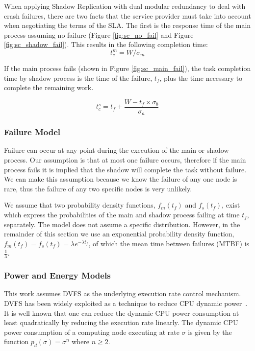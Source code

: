 When applying Shadow Replication with dual modular redundancy to deal with crash failures, 
there are two facts that the service provider must take into account
when negotiating the terms of the SLA. The first is the response time
of the main process assuming no failure (Figure
\ref{fig:sc_no_fail} and Figure \ref{fig:sc_shadow_fail}). This
results in the following completion time:
\begin{equation}
t_c^m=W/\sigma_m
\label{eq:tcm}
\end{equation}

If the main process fails (shown in Figure \ref{fig:sc_main_fail}), the
task completion time by shadow process is the time of the failure,
$t_f$, plus the time necessary to complete the remaining work.

\begin{equation}
t_c^s=t_f+\frac{W-t_f \times \sigma_b}{\sigma_a}
\label{eq:tcs}
\end{equation}

\subsubsection{Failure Model}
Failure can occur at any point during the execution of the main or
shadow process. Our assumption is that at most one failure occurs,
therefore if the main process fails it is implied that the shadow will
complete the task without failure. We can make this assumption because
we know the failure of any one node is rare, thus the failure
of any two specific nodes is very unlikely.

We assume that two probability density functions, $f_m(t_f)$ and
$f_s(t_f)$, exist which express the probabilities of the main and shadow
process failing at time $t_f$, separately. The model does not assume a
specific distribution. However, in the remainder of this section we use
an exponential probability density function, $f_m(t_f)=f_s(t_f)=\lambda
e^{-\lambda t_f}$, of which the mean time between failures (MTBF) is $\frac{1}{\lambda}$.

\subsubsection{Power and Energy Models}
This work assumes DVFS as the underlying execution rate control mechanism. 
DVFS has been widely exploited as a technique to reduce CPU dynamic power~\cite{pillai2001real,flautner2001automatic}. It
is well known that one can reduce the dynamic CPU power consumption at
least quadratically by reducing the execution rate linearly. The
dynamic CPU power consumption of a computing node executing at rate
$\sigma$ is given by the function $p_d(\sigma)=\sigma^n$ where $n \ge 2$.


